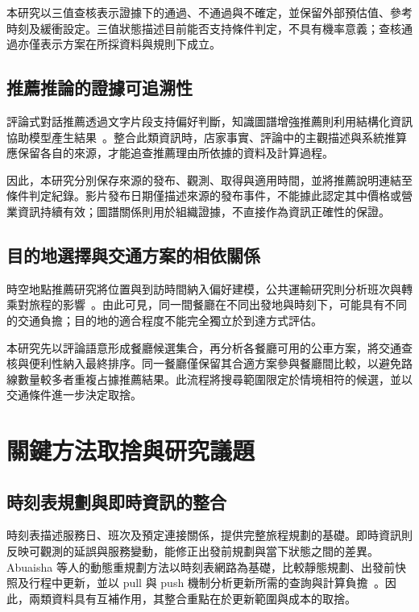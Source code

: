 本研究以三值查核表示證據下的通過、不通過與不確定，並保留外部預估值、參考時刻及緩衝設定。三值狀態描述目前能否支持條件判定，不具有機率意義；查核通過亦僅表示方案在所採資料與規則下成立。

\subsection{推薦推論的證據可追溯性}

評論式對話推薦透過文字片段支持偏好判斷，知識圖譜增強推薦則利用結構化資訊協助模型產生結果~\cite{critique_preference,knowledge_graph_llm_recommendation}。整合此類資訊時，店家事實、評論中的主觀描述與系統推算應保留各自的來源，才能追查推薦理由所依據的資料及計算過程。

因此，本研究分別保存來源的發布、觀測、取得與適用時間，並將推薦說明連結至條件判定紀錄。影片發布日期僅描述來源的發布事件，不能據此認定其中價格或營業資訊持續有效；圖譜關係則用於組織證據，不直接作為資訊正確性的保證。

\subsection{目的地選擇與交通方案的相依關係}

時空地點推薦研究將位置與到訪時間納入偏好建模，公共運輸研究則分析班次與轉乘對旅程的影響~\cite{poi_stisan,bus_dynamic_replanning}。由此可見，同一間餐廳在不同出發地與時刻下，可能具有不同的交通負擔；目的地的適合程度不能完全獨立於到達方式評估。

本研究先以評論語意形成餐廳候選集合，再分析各餐廳可用的公車方案，將交通查核與便利性納入最終排序。同一餐廳僅保留其合適方案參與餐廳間比較，以避免路線數量較多者重複占據推薦結果。此流程將搜尋範圍限定於情境相符的候選，並以交通條件進一步決定取捨。

\section{關鍵方法取捨與研究議題}

\subsection{時刻表規劃與即時資訊的整合}

時刻表描述服務日、班次及預定連接關係，提供完整旅程規劃的基礎。即時資訊則反映可觀測的延誤與服務變動，能修正出發前規劃與當下狀態之間的差異。Abuaisha 等人的動態重規劃方法以時刻表網路為基礎，比較靜態規劃、出發前快照及行程中更新，並以 pull 與 push 機制分析更新所需的查詢與計算負擔~\cite{bus_dynamic_replanning}。因此，兩類資料具有互補作用，其整合重點在於更新範圍與成本的取捨。

